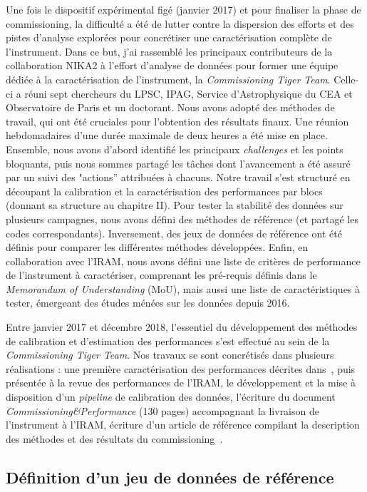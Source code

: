 Une fois le dispositif expérimental figé (janvier 2017) et pour
finaliser la phase de commissioning, la difficulté a été de lutter
contre la dispersion des efforts et des pistes d'analyse explorées
pour concrétiser une caractérisation complète de l'instrument. Dans ce
but, j'ai rassemblé les principaux contributeurs de la collaboration
NIKA2 à l'effort d'analyse de données pour former une équipe dédiée à
la caractérisation de l'instrument, la \emph{Commissioning Tiger
  Team}. Celle-ci a réuni sept chercheurs du LPSC, IPAG,
Service d'Astrophysique du CEA et Observatoire de Paris et un
doctorant. Nous avons adopté des méthodes de travail, qui ont été
cruciales pour l'obtention des résultats finaux. Une réunion
hebdomadaires d'une durée maximale de deux heures a été mise en
place. Ensemble, nous avons d'abord identifié les principaux
\emph{challenges} et les points
bloquants, puis nous sommes partagé les tâches dont l'avancement a été
assuré par un suivi des "actions'' attribuées à chacuns. Notre travail
s'est structuré en découpant la calibration et la caractérisation des
performances par blocs (donnant sa structure au chapitre II). Pour
tester la stabilité des données sur plusieurs campagnes, nous avons
défini des méthodes de référence (et partagé les codes
correspondants). Inversement, des jeux de données de référence ont été
définis pour comparer les différentes méthodes développées. Enfin, en
collaboration avec l'IRAM, nous avons défini une liste de
critères de performance de l'instrument à caractériser, comprenant les
pré-requis définis dans le \emph{Memorandum of Understanding} (MoU),
mais aussi une liste de caractéristiques à tester, émergeant des
études ménées sur les données depuis 2016. 

Entre janvier 2017 et décembre 2018, l'essentiel du développement des
méthodes de calibration et d'estimation des performances s'est
effectué au sein de la \emph{Commissioning Tiger Team}. Nos travaux se
sont concrétisés dans plusieurs réalisations : une première
caractérisation des performances décrites dans~\citet{Adam2018}, puis
présentée à la revue des performances de l'IRAM, le développement et
la mise à disposition d'un \emph{pipeline} de calibration des données,
l'écriture du document \emph{Commissioning\&Performance} (130 pages)
accompagnant la livraison de l'instrument à l'IRAM, écriture d'un
article de référence compilant la description des méthodes et des
résultats du commissioning~\citep{Perotto2019}. 



\subsection{Définition d'un jeu de données de référence}
\label{se:scan_selection}

